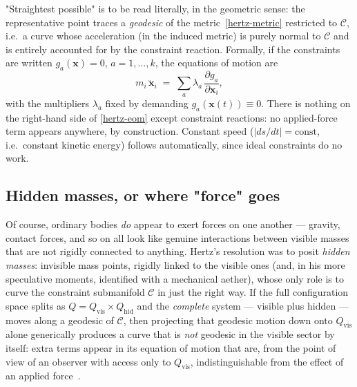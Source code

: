 "Straightest possible" is to be read literally, in the geometric
sense: the representative point traces a \emph{geodesic} of the
metric~\eqref{hertz-metric} restricted to $\mathcal C$, i.e.\ a
curve whose acceleration (in the induced metric) is purely normal to
$\mathcal C$ and is entirely accounted for by the constraint
reaction. Formally, if the constraints are written $g_a(\mathbf
x)=0$, $a=1,\dots,k$, the equations of motion are
\begin{equation}
  m_i\,\ddot{\mathbf x}_i \;=\; \sum_a \lambda_a\,
  \frac{\partial g_a}{\partial \mathbf x_i},
  \label{hertz-eom}
\end{equation}
with the multipliers $\lambda_a$ fixed by demanding $g_a(\mathbf
x(t))\equiv 0$. There is nothing on the right-hand side of
\eqref{hertz-eom} except constraint reactions: no applied-force
term appears anywhere, by construction. Constant speed
($|ds/dt|=\mathrm{const}$, i.e.\ constant kinetic energy) follows
automatically, since ideal constraints do no work.

\subsection{Hidden masses, or where "force" goes}

Of course, ordinary bodies \emph{do} appear to exert forces on one
another --- gravity, contact forces, and so on all look like genuine
interactions between visible masses that are not rigidly connected
to anything. Hertz's resolution was to posit \emph{hidden masses}:
invisible mass points, rigidly linked to the visible ones (and, in
his more speculative moments, identified with a mechanical
aether), whose only role is to curve the constraint submanifold
$\mathcal C$ in just the right way. If the full configuration space
splits as $Q = Q_{\mathrm{vis}}\times Q_{\mathrm{hid}}$ and the
\emph{complete} system --- visible plus hidden --- moves along a
geodesic of $\mathcal C$, then projecting that geodesic motion down
onto $Q_{\mathrm{vis}}$ alone generically produces a curve that is
\emph{not} geodesic in the visible sector by itself: extra terms
appear in its equation of motion that are, from the point of view of
an observer with access only to $Q_{\mathrm{vis}}$, indistinguishable
from the effect of an applied force~\cite{hertz}.


